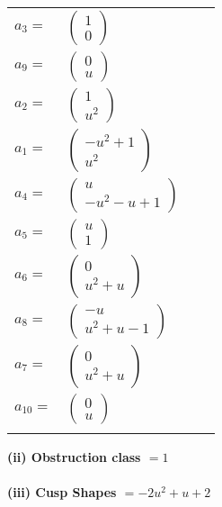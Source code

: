 \documentclass[1p]{elsarticle_modified}
\theoremstyle{definition}
\begin{document}
\begin{tabular}{m{7pt} m{180pt} m{7pt} m{180pt} }
\flushright $a_{3}=$&$\begin{pmatrix}1\\0\end{pmatrix}$ \\
\flushright $a_{9}=$&$\begin{pmatrix}0\\u\end{pmatrix}$ \\
\flushright $a_{2}=$&$\begin{pmatrix}1\\u^2\end{pmatrix}$ \\
\flushright $a_{1}=$&$\begin{pmatrix}- u^2+1\\u^2\end{pmatrix}$ \\
\flushright $a_{4}=$&$\begin{pmatrix}u\\- u^2- u+1\end{pmatrix}$ \\
\flushright $a_{5}=$&$\begin{pmatrix}u\\1\end{pmatrix}$ \\
\flushright $a_{6}=$&$\begin{pmatrix}0\\u^2+u\end{pmatrix}$ \\
\flushright $a_{8}=$&$\begin{pmatrix}- u\\u^2+u-1\end{pmatrix}$ \\
\flushright $a_{7}=$&$\begin{pmatrix}0\\u^2+u\end{pmatrix}$ \\
\flushright $a_{10}=$&$\begin{pmatrix}0\\u\end{pmatrix}$\\&\end{tabular}
\flushleft \textbf{(ii) Obstruction class $= 1$}\\~\\
\flushleft \textbf{(iii) Cusp Shapes $= -2 u^2+u+2$}\\~\\
\end{document}
